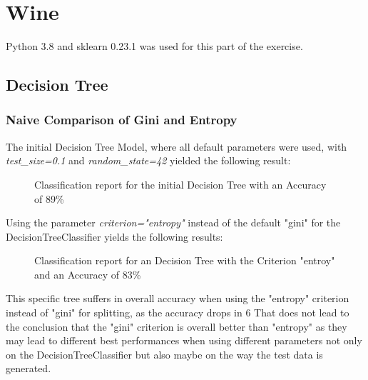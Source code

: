\documentclass[a4paper, 11pt]{article}
\begin{document}
\section{Wine}
Python 3.8 and sklearn 0.23.1 was used for this part of the exercise.\\
\subsection{Decision Tree}
\subsubsection{Naive Comparison of Gini and Entropy}
The initial Decision Tree Model, where all default parameters were used, with \textit{test\_size=0.1} and \textit{random\_state=42} yielded the following result:

\begin{figure}[H]
\centering
{}
\caption{Classification report for the initial Decision Tree with an Accuracy of 89\%}
\end{figure}

Using the parameter \textit{criterion="entropy"} instead of the default "gini" for the DecisionTreeClassifier yields the following results:

\begin{figure}[H]
\centering
{}
\caption{Classification report for an Decision Tree with the Criterion "entroy" and an Accuracy of 83\%}
\end{figure}

This specific tree suffers in overall accuracy when using the "entropy" criterion instead of "gini" for splitting, as the accuracy drops in 6%
That does not lead to the conclusion that the "gini" criterion is overall better than "entropy" as they may lead to different best performances when using different parameters not only on the DecisionTreeClassifier but also maybe on the way the test data is generated.
\end{document}
